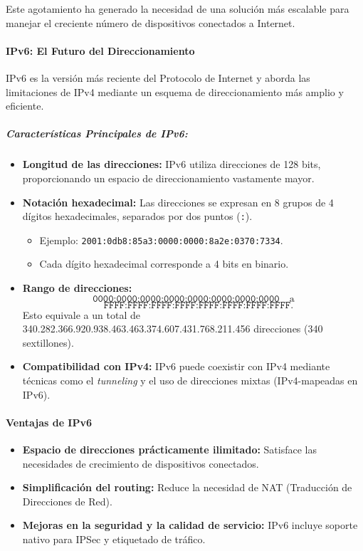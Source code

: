 \documentclass[a4paper,12pt]{article}
\begin{document}
Este agotamiento ha generado la necesidad de una solución más escalable para manejar el creciente número de dispositivos conectados a Internet.

\paragraph{IPv6: El Futuro del Direccionamiento}

IPv6 es la versión más reciente del Protocolo de Internet y aborda las limitaciones de IPv4 mediante un esquema de direccionamiento más amplio y eficiente.

\subparagraph{Características Principales de IPv6:}
\begin{itemize}
    \item \textbf{Longitud de las direcciones:} IPv6 utiliza direcciones de 128 bits, proporcionando un espacio de direccionamiento vastamente mayor.
    \item \textbf{Notación hexadecimal:} Las direcciones se expresan en 8 grupos de 4 dígitos hexadecimales, separados por dos puntos (\texttt{:}).
    \begin{itemize}
        \item Ejemplo: \texttt{2001:0db8:85a3:0000:0000:8a2e:0370:7334}.
        \item Cada dígito hexadecimal corresponde a 4 bits en binario.
    \end{itemize}
    \item \textbf{Rango de direcciones:} 
    \[
    \texttt{0000:0000:0000:0000:0000:0000:0000:0000} \quad \text{a} \] \[\quad \texttt{FFFF:FFFF:FFFF:FFFF:FFFF:FFFF:FFFF:FFFF}.
    \]
    Esto equivale a un total de 340.282.366.920.938.463.463.374.607.431.768.211.456 direcciones (340 sextillones).
    \item \textbf{Compatibilidad con IPv4:} IPv6 puede coexistir con IPv4 mediante técnicas como el \textit{tunneling} y el uso de direcciones mixtas (IPv4-mapeadas en IPv6).
\end{itemize}

\paragraph{Ventajas de IPv6}

\begin{itemize}
    \item \textbf{Espacio de direcciones prácticamente ilimitado:} Satisface las necesidades de crecimiento de dispositivos conectados.
    \item \textbf{Simplificación del routing:} Reduce la necesidad de NAT (Traducción de Direcciones de Red).
    \item \textbf{Mejoras en la seguridad y la calidad de servicio:} IPv6 incluye soporte nativo para IPSec y etiquetado de tráfico.
\end{itemize}
\end{document}

